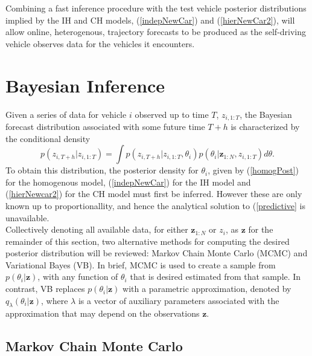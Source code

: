 \documentclass[12pt,a4paper]{article}\usepackage[]{graphicx}\usepackage[]{color}
\begin{document}
Combining a fast inference procedure with the test vehicle posterior distributions implied by the IH and CH models, (\ref{indepNewCar}) and (\ref{hierNewCar2}), will allow online, heterogenous, trajectory forecasts to be produced as the self-driving vehicle observes data for the vehicles it encounters.

\section{Bayesian Inference}
\label{sec:Inference}

Given a series of data for vehicle $i$ observed up to time $T$, $z_{i, 1:T}$, the Bayesian forecast distribution associated with some future time $T+h$ is characterized by the conditional density
\begin{equation}
\label{predictive}
p(z_{i, T+h} | z_{i, 1:T}) =\int p(z_{i, T+h}|z_{i, 1:T}, \theta_i) p(\theta_i | \textbf{z}_{1:N}, z_{i, 1:T}) d\theta.
\end{equation}
To obtain this distribution, the posterior density for $\theta_i$, given by (\ref{homogPost}) for the homogenous model, (\ref{indepNewCar}) for the IH model and (\ref{hierNewcar2}) for the CH model must first be inferred. However these are only known up to proportionallity, and hence the analytical solution to (\ref{predictive} is unavailable.
\\

Collectively denoting all available data, for either $\textbf{z}_{1:N}$ or $z_{i}$, as $\textbf{z}$ for the remainder of this section, two alternative methods for computing the desired posterior distribution will be reviewed: Markov Chain Monte Carlo (MCMC) and Variational Bayes (VB). In brief, MCMC is used to create a sample from $p(\theta_i | \textbf{z})$, with any function of $\theta_i$ that is desired estimated from that sample. In contrast, VB replaces $p(\theta_i | \textbf{z})$ with a parametric approximation, denoted by $q_{\lambda}(\theta_i |\textbf{z})$, where $\lambda$ is a vector of auxiliary parameters associated with the approximation that may depend on the observations $\textbf{z}$.

\subsection{Markov Chain Monte Carlo}
\label{subsec:MCMC}
\end{document}
